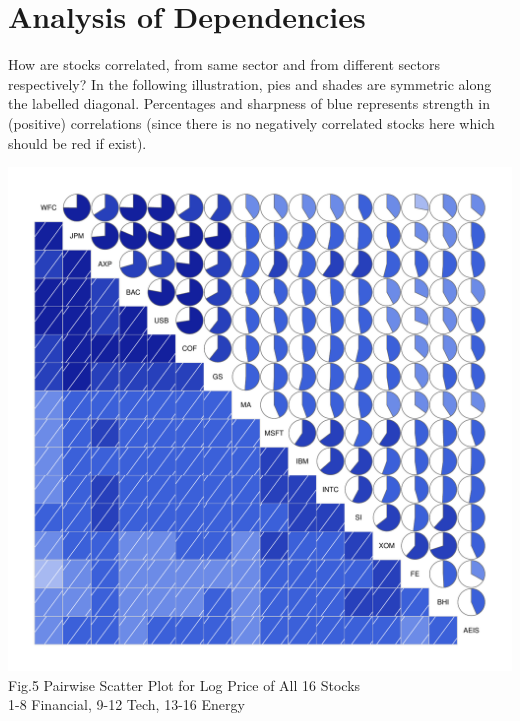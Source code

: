 \documentclass[11pt]{article}
\begin{document}
\section{Analysis of Dependencies}\vspace{-1em}
How are stocks correlated, from same sector and from different sectors respectively? In the following illustration, pies and shades are symmetric along the labelled diagonal. Percentages and sharpness of blue represents strength in (positive) correlations (since there is no negatively correlated stocks here which should be red if exist).
\vspace{-2em}
\begin{center}
  \includegraphics[width=1\linewidth]{graph/PairWiseScatterPlotForAllPie.pdf}\vspace{-1em}
  Fig.5 Pairwise Scatter Plot for Log Price of All 16 Stocks\\ 1-8 Financial, 9-12 Tech, 13-16 Energy
\end{center}
\end{document}

